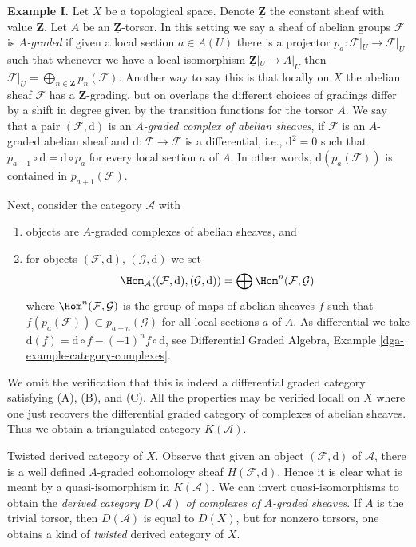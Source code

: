 \medskip\noindent
{\bf Example I.} Let $X$ be a topological space. Denote
$\underline{\mathbf{Z}}$ the constant sheaf with value $\mathbf{Z}$.
Let $A$ be an $\underline{\mathbf{Z}}$-torsor. In this setting we say
a sheaf of abelian groups $\mathcal{F}$ is {\it $A$-graded} if given a
local section $a \in A(U)$ there is a projector
$p_a : \mathcal{F}|_U \to \mathcal{F}|_U$ such that
whenever we have a local isomorphism $\underline{\mathbf{Z}}|_U \to A|_U$
then $\mathcal{F}|_U = \bigoplus_{n \in \mathbf{Z}} p_n(\mathcal{F})$.
Another way to say this is that locally on $X$ the abelian sheaf
$\mathcal{F}$ has a $\mathbf{Z}$-grading, but on overlaps the different
choices of gradings differ by a shift in degree given by the transition
functions for the torsor $A$.
We say that a pair $(\mathcal{F}, \text{d})$ is an
{\it $A$-graded complex of abelian sheaves}, if $\mathcal{F}$
is an $A$-graded abelian sheaf and $\text{d} : \mathcal{F} \to \mathcal{F}$
is a differential, i.e., $\text{d}^2 = 0$ such that
$p_{a + 1} \circ \text{d} = \text{d} \circ p_a$ for every local
section $a$ of $A$. In other words, $\text{d}(p_a(\mathcal{F}))$
is contained in $p_{a + 1}(\mathcal{F})$.

\medskip\noindent
Next, consider the category $\mathcal{A}$ with
\begin{enumerate}
\item objects are $A$-graded complexes of abelian sheaves, and
\item for objects $(\mathcal{F}, \text{d})$, $(\mathcal{G}, \text{d})$ we set
$$
\Hom_\mathcal{A}((\mathcal{F}, \text{d}), (\mathcal{G}, \text{d})) =
\bigoplus \Hom^n(\mathcal{F}, \mathcal{G})
$$
where $\Hom^n(\mathcal{F}, \mathcal{G})$ is the group of
maps of abelian sheaves $f$ such that
$f(p_a(\mathcal{F})) \subset p_{a + n}(\mathcal{G})$ for all
local sections $a$ of $A$. As differential we take
$\text{d}(f) = \text{d} \circ f - (-1)^n f \circ \text{d}$, see
Differential Graded Algebra, Example \ref{dga-example-category-complexes}.
\end{enumerate}
We omit the verification that this is indeed a differential graded category
satisfying (A), (B), and (C). All the properties may be verified locall on
$X$ where one just recovers the differential graded category of complexes
of abelian sheaves. Thus we obtain a triangulated category
$K(\mathcal{A})$.

\medskip\noindent
Twisted derived category of $X$. Observe that given an object
$(\mathcal{F}, \text{d})$ of $\mathcal{A}$, there is a well defined
$A$-graded cohomology sheaf $H(\mathcal{F}, \text{d})$.
Hence it is clear what is meant by a quasi-isomorphism
in $K(\mathcal{A})$. We can invert quasi-isomorphisms
to obtain the {\it derived category $D(\mathcal{A})$ of complexes of
$A$-graded sheaves}. If $A$ is the trivial torsor, then $D(\mathcal{A})$
is equal to $D(X)$, but for nonzero torsors, one obtains a kind of
{\it twisted} derived category of $X$.

